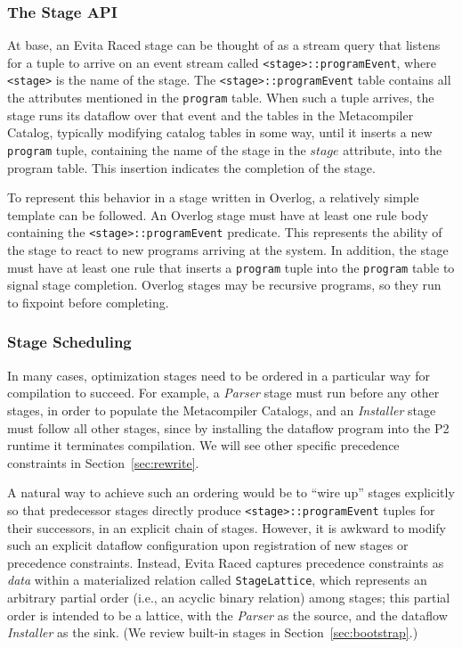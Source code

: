 \documentclass{sigmod08}
\newcommand{\ol}[1]{\texttt{\small #1}\xspace}
\begin{document}
\subsubsection{The Stage API}
At base, an Evita Raced stage can be thought of as a stream query that listens for a tuple to arrive on an event stream called \ol{<stage>::programEvent}, where \ol{<stage>} is the name of the stage. 
The \ol{<stage>::programEvent} table contains all the attributes mentioned in the \ol{program} table. When such a tuple arrives, the stage runs its dataflow over that event and the tables in the Metacompiler Catalog, typically modifying catalog tables in some way, until it inserts a new \ol{program} tuple, containing the name of the stage in
the $stage$ attribute, into the program table. This insertion indicates
the completion of the stage.

To represent this behavior in a stage written in Overlog, a relatively
simple template can be followed.  An Overlog stage must have at least
one rule body containing the \ol{<stage>::programEvent} predicate. This 
represents the ability of the stage to react to new programs arriving at
the system.  In addition, the stage must have
at least one rule that
inserts a \ol{program} tuple into the \ol{program} table to signal stage
completion.  Overlog stages may be recursive programs, so they run
to fixpoint before completing.

\subsubsection{Stage Scheduling}
\label{sec:stageschedule}
In many cases, optimization stages need to be ordered in a particular way for compilation to succeed.  For example, a {\em Parser} stage must run before any 
other stages, in order to populate the Metacompiler Catalogs, and an {\em Installer} stage must follow all 
other stages, since by installing the dataflow program into the P2 runtime it terminates compilation.  
We will see other specific precedence constraints in Section~\ref{sec:rewrite}.  


A natural way to achieve such an ordering would be to ``wire up'' stages
explicitly so that predecessor stages directly produce
\ol{<stage>::programEvent} tuples for their successors, in an explicit chain of stages.  However, it is awkward to modify such an explicit dataflow configuration upon registration of new stages or precedence constraints.
% 
Instead, Evita Raced captures precedence constraints as {\em data}
within a materialized
relation called \ol{StageLattice}, which represents an arbitrary partial
order (i.e., an acyclic binary relation) among stages; this partial
order is intended to be a lattice, with the {\em Parser} as the source,
and the dataflow {\em Installer} as the sink.  (We review built-in stages in Section~\ref{sec:bootstrap}.)
 
\end{document}
